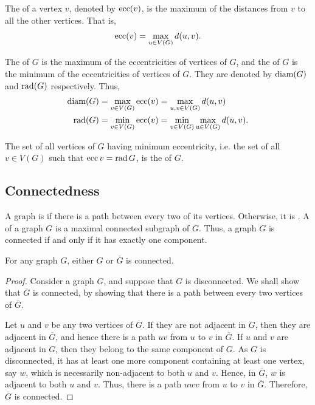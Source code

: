 The  of a vertex $v$, denoted by $\operatorname{ecc}(v)$, is the maximum of the distances from $v$ to all the other vertices. That is,
\begin{equation*}
    \operatorname{ecc}(v) = \max_{u \in V(G)} d(u, v) .
\end{equation*}

The  of $G$ is the maximum of the eccentricities of vertices of $G$, and the  of $G$ is the minimum of the eccentricities of vertices of $G$. They are denoted by $\operatorname{diam}(G)$ and $\operatorname{rad}(G)$ respectively. Thus,
\begin{align*}
    \operatorname{diam}(G) & = \max_{v \in V(G)} \operatorname{ecc}(v)= \max_{u, v \in V(G)} d(u, v) \\
    \operatorname{rad}(G) & = \min_{v \in V(G)}\operatorname{ecc}(v) = \min_{v \in V(G)} \max_{u \in V(G)} d(u, v).
\end{align*}

The set of all vertices of $G$ having minimum eccentricity, i.e. the set of all $v \in V(G)$ such that $\operatorname{ecc} v = \operatorname{rad} G$, is the  of $G$.

\subsection{Connectedness}\label{subsec:Connectedness}

A graph is  if there is a path between every two of its vertices. Otherwise, it is . A  of a graph $G$ is a maximal connected subgraph of $G$. Thus, a graph $G$ is connected if and only if it has exactly one component.

\begin{Theorem}\label{thm:GorGCompConn}
For any graph $G$, either $G$ or $\overline G$ is connected.
\end{Theorem}

\begin{proof}
Consider a graph $G$, and suppose that $G$ is disconnected. We shall show that $\overline G$ is connected, by showing that there is a path between every two vertices of $\overline G$.

Let $u$ and $v$ be any two vertices of $\overline G$. If they are not adjacent in $G$, then they are adjacent in $\overline G$, and hence there is a path $uv$ from $u$ to $v$ in $\overline G$. If $u$ and $v$ are adjacent in $G$, then they belong to the same component of $G$. As $G$ is disconnected, it has at least one more component containing at least one vertex, say $w$, which is necessarily non-adjacent to both $u$ and $v$. Hence, in $\overline G$, $w$ is adjacent to both $u$ and $v$. Thus, there is a path $uwv$ from $u$ to $v$ in $\overline G$. Therefore, $\overline G$ is connected.
\end{proof}

